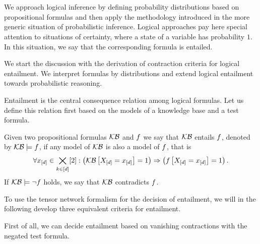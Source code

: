 \chapter{\chatextlogicalReasoning}\label{cha:logicalReasoning}

We approach logical inference by defining probability distributions based on propositional formulas and then apply the methodology introduced in the more generic situation of probabilistic inference.
Logical approaches pay here special attention to situations of certainty, where a state of a variable has probability $1$.
In this situation, we say that the corresponding formula is entailed.

We start the discussion with the derivation of contraction criteria for logical entailment.
We interpret formulas by distributions and extend logical entailment towards probabilistic reasoning.


Entailment is the central consequence relation among logical formulas.
Let us define this relation first based on the models of a knowledge base and a test formula.

\begin{definition}
    \label{def:logicalEntailment}
    Given two propositional formulas $\mathcal{KB}$ and $f$ we say that $\mathcal{KB}$ entails $f$, denoted by $\mathcal{KB}\models f$, if any model of $\mathcal{KB}$ is also a model of $f$, that is
    \begin{align*}
        \forall{x_{[d]}\in\bigtimes_{k\in[d]}[2]}:{\left(\mathcal{KB}\left[X_{[d]}=x_{[d]}\right]=1\right)\Rightarrow\left(f\left[X_{[d]}=x_{[d]}\right]=1\right)} \, .
    \end{align*}
    If $\mathcal{KB}\models\lnot f$ holds, we say that $\mathcal{KB}$ contradicts $f$.
\end{definition}

To use the tensor network formalism for the decision of entailment, we will in the following develop three equivalent criteria for entailment. %


First of all, we can decide entailment based on vanishing contractions with the negated test formula.

